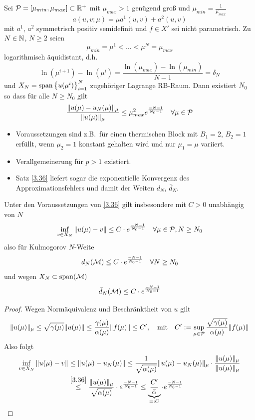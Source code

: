 \begin{satz}[Globale exponentielle Konvergenz, $p=1$] \label{3.36}
	Sei $\mathcal{P} = [\mu_{min},\mu_{max}] \subset \mathbb{R}^+$ mit $\mu_{max} > 1$ genügend groß und $\mu_{min} = \frac{1}{\mu_{max}}$
	\[
		a(u,v;\mu) = \mu a^1(u,v) + a^2(u,v)
	\]
	mit $a^1$, $a^2$ symmetrisch positiv semidefinit und $f \in X'$ sei nicht parametrisch. Zu $N \in \mathbb{N}$, $N \geq 2$ seien
	\[
		\mu_{min} = \mu^1 < \dots < \mu^N = \mu_{max}
	\]
	logarithmisch äquidistant, d.h.\
	\[
		\ln(\mu^{i+1}) - \ln(\mu^i) = \frac{\ln(\mu_{max})-\ln(\mu_{min})}{N-1} = \delta_N
	\]
	und $X_N = \operatorname{span}\left\{u(\mu^i)\right\}_{i=1}^N$ zugehöriger Lagrange RB-Raum. Dann existiert $N_0$ so dass für alle $N \geq N_0$ gilt
	\begin{equation}
		\frac{\|u(\mu)-u_N(\mu)\|_\mu}{\|u(\mu)\|_\mu} \leq \mu_{max}^2 e^{\frac{-N-1}{N_0-1}} \quad \forall \mu \in \mathcal{P}
	\end{equation}
\end{satz}

\begin{bem} \beginwithlistbem
	\begin{itemize}
		\item Voraussetzungen sind z.B.\ für einen thermischen Block mit $B_1 = 2$, $B_2 = 1$ erfüllt, wenn $\mu_2 = 1$ konstant gehalten wird und nur $\mu_1 = \mu$ variiert.
		\item Verallgemeinerung für $p > 1$ existiert.
		\item Satz \ref{3.36} liefert sogar die exponentielle Konvergenz des Approximationsfehlers und damit der Weiten $d_N$, $\bar d_N$.
	\end{itemize}
\end{bem}

\begin{kor}
	Unter den Voraussetzungen von \ref{3.36} gilt insbesondere mit $C > 0$ unabhängig von $N$
	\[
		\inf_{v\in X_N} \|u(\mu)-v\| \leq C \cdot e^{\frac{-N-1}{N_0-1}} \quad \forall \mu \in \mathcal{P}, N \geq N_0
	\]
	also für Kulmogorov $N$-Weite
	\[
		d_N(\mathcal{M}) \leq C \cdot e^\frac{-N-1}{N_0-1} \quad \forall N \geq N_0
	\]
	und wegen $X_N \subset \operatorname{span}(\mathcal{M})$
	\[
		\bar d_N(\mathcal{M}) \leq C \cdot e^\frac{-N-1}{N_0-1}
	\]

	\begin{proof}
		Wegen Normäquivalenz und Beschränktheit von $u$ gilt
		\[
			\|u(\mu)\|_\mu \leq \sqrt{\gamma(\mu)} \|u(\mu)\| \leq \frac{\gamma(\mu)}{\alpha(\mu)} \|f(\mu)\| \leq C', \quad \text{mit} \quad C' := \sup_{\mu \in \mathcal{P}} \frac{\sqrt{\gamma(\mu)}}{\alpha(\mu)} \|f(\mu)\|
		\]
		Also folgt
		\begin{align*}
			\inf_{v\in X_N} \|u(\mu)-v\| &\leq \|u(\mu)-u_N(\mu)\| \leq \frac{1}{\sqrt{\alpha(\mu)}} \|u(\mu)-u_N(\mu)\|_\mu \cdot \frac{\|u(\mu)\|_\mu}{\|u(\mu)\|_\mu}\\
			&\stackrel{\ref{3.36}}{\leq} \frac{\|u(\mu)\|_\mu}{\sqrt{\alpha(\mu)}} \cdot e^\frac{-N-1}{N_0-1} \leq \underbrace{\frac{C'}{\bar\alpha}}_{=: C} \cdot e^\frac{-N-1}{N_0-1}
		\end{align*}
	\end{proof}
\end{kor}

